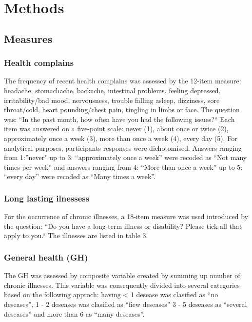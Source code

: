 \documentclass[ijerph,article,accept,moreauthors,pdftex]{mdpi}
\begin{document}
\hypertarget{methods}{%
\section{Methods}\label{methods}}

\hypertarget{measures}{%
\subsection{Measures}\label{measures}}

\hypertarget{health-complains}{%
\subsubsection{Health complains}\label{health-complains}}

The frequency of recent health complains was assessed by the 12-item
measure: headache, stomachache, backache, intestinal problems, feeling
depressed, irritability/bad mood, nervousness, trouble falling asleep,
dizziness, sore throat/cold, heart pounding/chest pain, tingling in
limbs or face. The question was: ``In the past month, how often have you
had the following issues?{}`` Each item was answered on a five-point
scale: never (1), about once or twice (2), approximately once a week
(3), more than once a week (4), every day (5). For analytical purposes,
participants responses were dichotomised. Answers ranging from
1:''never" up to 3: ``approximately once a week'' were recoded as ``Not
many times per week'' and answers ranging from 4: ``More than once a
week'' up to 5: ``every day'' were recoded as ``Many times a week''.

\hypertarget{long-lasting-ilnessess}{%
\subsubsection{Long lasting ilnessess}\label{long-lasting-ilnessess}}

For the occurrence of chronic illnesses, a 18-item measure was used
introduced by the question: ``Do you have a long-term illness or
disability? Please tick all that apply to you.`` The illnesses are
listed in table 3.

\hypertarget{general-health-gh}{%
\subsubsection{General health (GH)}\label{general-health-gh}}

The GH was assessed by composite variable created by summing up number
of chronic illnesses. This variable was consequently divided into
several categories based on the following approch: having \textless{} 1
desease was clasified as ``no deseases'', 1 - 2 deseases was clasified
as ``fiew deseases'' 3 - 5 deseases as ``several deseases'' and more
than 6 as ``many deseases''.
\end{document}
